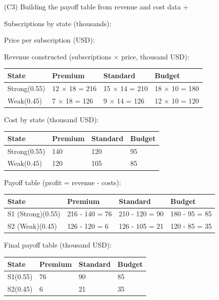 \documentclass[11pt]{article}
\begin{document}
	
	(C3) Building the payoff table from revenue and cost data
	+
	
	
	Subscriptions by state (thousands):
	
	Price per subscription (USD):
	
	Revenue constructed (subscriptions × price, thousand USD):
	\begin{center}
		\begin{tabular}{llll}
			\toprule
			State & Premium & Standard & Budget \\
			\midrule
			Strong\newline (0.55) & 12 × 18 = 216 & 15 × 14 = 210 & 18 × 10 = 180 \\
			Weak\newline (0.45) & 7 × 18 = 126 & 9 × 14 = 126 & 12 × 10 = 120 \\
			\bottomrule
		\end{tabular}
	\end{center}
	
	
	Cost by state (thousand USD):
	\begin{center}
		\begin{tabular}{llll}
			\toprule
			State & Premium & Standard & Budget \\
			\midrule
			Strong\newline (0.55) & 140 & 120 & 95 \\
			Weak\newline (0.45) & 120 & 105 & 85 \\
			\bottomrule
		\end{tabular}
	\end{center}
	
	
	Payoff table (profit = revenue - costs):
	\begin{center}
		\begin{tabular}{llll}
			\toprule
			State & Premium & Standard & Budget \\
			\midrule
			S1 (Strong)\newline (0.55) & 216 - 140 = 76 & 210 - 120 = 90 & 180 - 95 = 85 \\
			S2 (Weak)\newline (0.45) & 126 - 120 = 6 & 126 - 105 = 21 & 120 - 85 = 35 \\
			\bottomrule
		\end{tabular}
	\end{center}
	
	
	Final payoff table (thousand USD):
	\begin{center}
		\begin{tabular}{llll}
			\toprule
			State & Premium & Standard & Budget \\
			\midrule
			S1\newline (0.55) & 76 & 90 & 85 \\
			S2\newline (0.45) & 6 & 21 & 35 \\
			\bottomrule
		\end{tabular}
	\end{center}
	
\end{document}
